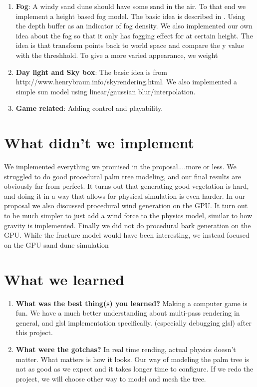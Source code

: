 \documentclass[annual]{acmsiggraph}
\begin{document}
\begin{enumerate}
\item{\textbf{Fog}: A windy sand dune should have some sand in the air. To that end we implement a height based fog model. The basic idea is described in \cite{hoffman2008}. Using the depth buffer as an indicator of fog density. We also implemented our own idea about the fog so that it only has fogging effect for at certain height. The idea is that transform points back to world space and compare the y value with the threshhold.  To give a more varied appearance,  we weight }
\item{\textbf{Day light and Sky box}: The basic idea is from http://www.henrybraun.info/skyrendering.html. We also implemented a simple sun model using linear/gaussian blur/interpolation.}
\item{\textbf{Game related}: Adding control and playability. }
\end{enumerate}

\section{What didn't we implement}
We implemented everything we promised in the proposal....more or less.   We struggled to do good procedural palm tree modeling, and our final results are obviously far from perfect.    It turns out that generating good vegetation is hard, and doing it in a way that allows for physical simulation is even harder.  In our proposal we also discussed procedural wind generation on the GPU.  It turn out to be much simpler to just add a wind force to the physics model,  similar to how gravity is implemented.  Finally we did not do procedural bark generation on the GPU.  While the fracture model would have been interesting, we instead focused on the GPU sand dune simulation  


\section{What we learned}
\begin{enumerate}
\item{\textbf{What was the best thing(s) you learned?} Making a computer game is fun. We have a much better understanding about multi-pass rendering in general, and glsl implementation specifically.   (especially debugging glsl) after this project.}
\item{\textbf{What were the gotchas?} In real time rending, actual physics doesn't matter. What matters is how it looks. Our way of modeling the palm tree is not as good as we expect and it takes longer time to configure. If we redo the project, we will choose other way to model and mesh the tree.}
\end{enumerate}
\end{document}
